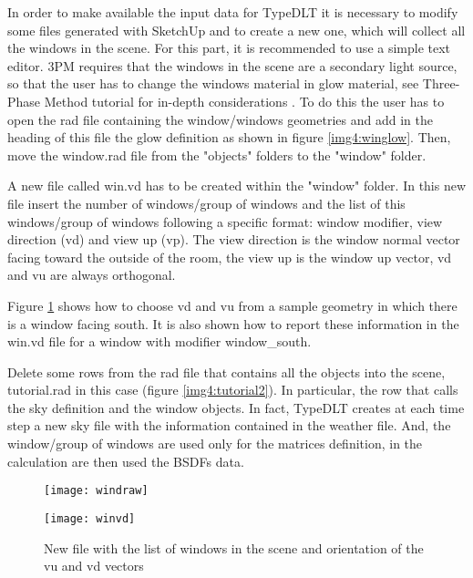 In order to make available the input data for TypeDLT it is necessary to modify some files generated with SketchUp and to create a new one, which will collect all the windows in the scene. For this part, it is recommended to use a simple text editor. 3PM requires that the windows in the scene are a secondary light source, so that the user has to change the windows material in glow material, see Three-Phase Method tutorial for in-depth considerations \cite{3ph_tut}. To do this the user has to open the rad file containing the window/windows geometries and add in the heading of this file the glow definition as shown in figure \ref{img4:winglow}. Then, move the window.rad file from the "objects" folders to the "window" folder.

A new file called {\color{blue} win.vd} has to be created within the "window" folder. In this new file insert the number of windows/group of windows and the list of this windows/group of windows following a specific format: window modifier, view direction (vd) and view up (vp). The view direction is the window normal vector facing toward the outside of the room, the view up is the window up vector, vd and vu are always orthogonal.

Figure \ref{img4:windoworient} shows how to choose vd and vu from a sample geometry in which there is a window facing south. It is also shown how to report these information in the win.vd file for a window with modifier window\_south. 

Delete some rows from the rad file that contains all the objects into the scene, tutorial.rad in this case (figure \ref{img4:tutorial2}). In particular, the row that calls the sky definition and the window objects. In fact, TypeDLT creates at each time step a new sky file with the information contained in the weather file. And, the window/group of windows are used only for the matrices definition, in the calculation are then used the BSDFs data.

\begin{figure}[h]
\centering
\begin{minipage}[c]{0.6\linewidth}
\texttt{[image: windraw]}
\end{minipage}
\quad
\begin{minipage}[c]{0.3\linewidth}
\texttt{[image: winvd]}
\end{minipage}
\caption{\label{img4:windoworient} New file with the list of windows in the scene and orientation of the vu and vd vectors}
\end{figure}


